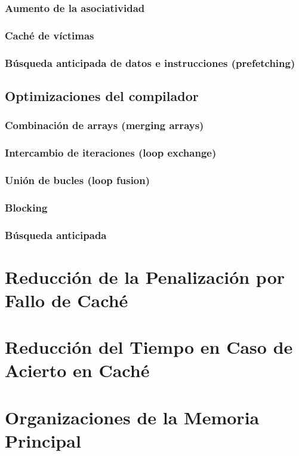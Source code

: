 \documentclass[12pt,onecolumn]{memoir}
\begin{document}
\subsubsection{Aumento de la asociatividad}

\subsubsection{Caché de víctimas}

\subsubsection{Búsqueda anticipada de datos e instrucciones (prefetching)}

\subsection{Optimizaciones del compilador}

\subsubsection{Combinación de arrays (merging arrays)}

\subsubsection{Intercambio de iteraciones (loop exchange)}

\subsubsection{Unión de bucles (loop fusion)}

\subsubsection{Blocking}

\subsubsection{Búsqueda anticipada}


\section{Reducción de la Penalización por Fallo de Caché}

\section{Reducción del Tiempo en Caso de Acierto en Caché}

\section{Organizaciones de la Memoria Principal}

 
 
\end{document}
